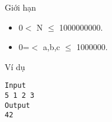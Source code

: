 Giới hạn  
\begin{itemize}
	\item     0$<$ N  $\le$ 1000000000.   
	\item     0=$<$ a,b,c  $\le$ 1000000.   
\end{itemize}
   Ví dụ  
\begin{verbatim}
Input
5 1 2 3
Output
42
\end{verbatim}